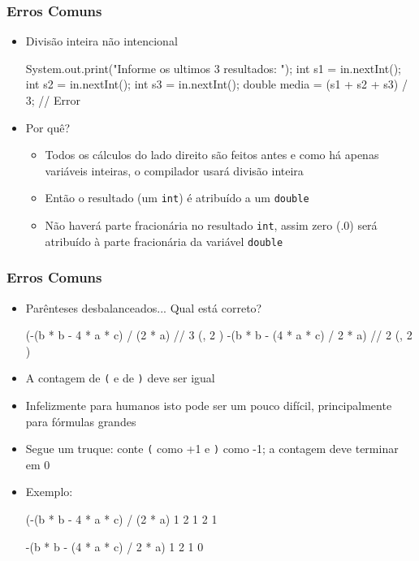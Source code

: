 \documentclass[xcolor={dvipsnames,table},aspectratio=169]{beamer}
\begin{document}
\begin{frame}[fragile]\frametitle{Erros Comuns}
\begin{itemize}
	\item Divisão inteira não intencional
\begin{javacode}
System.out.print("Informe os ultimos 3 resultados: ");
int s1 = in.nextInt();
int s2 = in.nextInt();
int s3 = in.nextInt();
double media = (s1 + s2 + s3) / 3; // Error
\end{javacode}
	\item Por quê?
	\begin{itemize}
		\item Todos os cálculos do lado direito são feitos antes e como há apenas variáveis inteiras, o compilador usará divisão inteira
		\item Então o resultado (um \texttt{int}) é atribuído a um \texttt{double}
		\item Não haverá parte fracionária no resultado \texttt{int}, assim zero (.0) será atribuído à parte fracionária da variável \texttt{double}
	\end{itemize}
\end{itemize}
\end{frame}

\begin{frame}[fragile]\frametitle{Erros Comuns}
\begin{itemize}
	\item Parênteses desbalanceados... Qual está correto?
{\scriptsize
\begin{javacode}
(-(b * b - 4 * a * c) / (2 * a)   // 3 (, 2 )
-(b * b - (4 * a * c) / 2 * a)    // 2 (, 2 )
\end{javacode}
}
	\item A contagem de \texttt{(} e de \texttt{)} deve ser igual
	\item Infelizmente para humanos isto pode ser um pouco difícil, principalmente para fórmulas grandes
	\item Segue um truque: conte \texttt{(} como +1 e \texttt{)} como -1; a contagem deve terminar em 0
	\item Exemplo:
{\scriptsize
\begin{javacode}
(-(b * b - 4 * a * c) / (2 * a)
1 2                 1   2     1   

-(b * b - (4 * a * c) / 2 * a)
 1        2        1         0
\end{javacode}
}
\end{itemize}
\end{frame}
\end{document}
